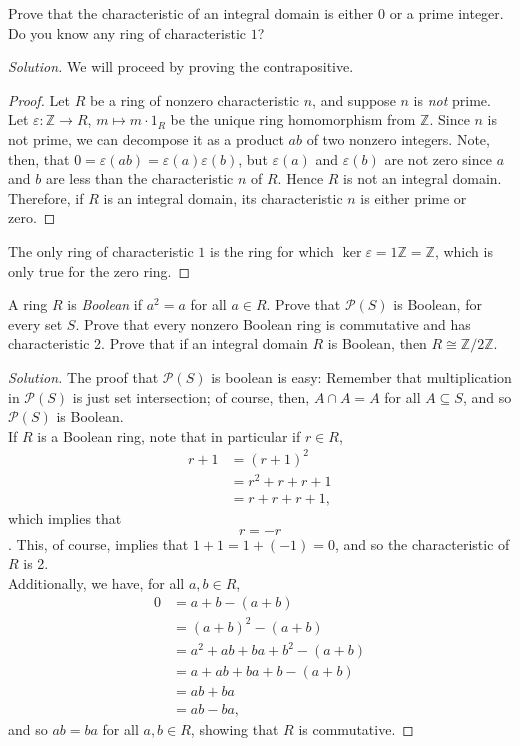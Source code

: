 \documentclass[12pt]{article}
\newenvironment{problem}[2][Problem]{\begin{trivlist}
\item[\hskip \labelsep {\bfseries #1}\hskip \labelsep {\bfseries #2.}]}{\end{trivlist}}
\newenvironment{solution}
  {\renewcommand\qedsymbol{$\blacksquare$}\begin{proof}[Solution]}
{\end{proof}}
\newenvironment{sproof}{
  \renewcommand\qedsymbol{$\square$}
  \begin{proof}
  }{
  \end{proof}
}
\theoremstyle{remark}
\begin{document}
\begin{problem}{3.14}
  Prove that the characteristic of an integral domain is either $0$ or a prime integer.
  Do you know any ring of characteristic $1$?
\end{problem}
\begin{solution}
  We will proceed by proving the contrapositive.
  \begin{sproof}
    Let $R$ be a ring of nonzero characteristic $n$, and suppose $n$ is \textit{not} prime.
    Let $\varepsilon:\mathbb{Z}\to R$, $m\mapsto m\cdot1_R$ be the unique ring homomorphism from $\mathbb{Z}$.
    Since $n$ is not prime, we can decompose it as a product $ab$ of two nonzero integers.
    Note, then, that $0=\varepsilon(ab)=\varepsilon(a)\varepsilon(b)$, but 
    $\varepsilon(a)$ and $\varepsilon(b)$ are not zero since $a$ and $b$ are less than
    the characteristic $n$ of $R$.
    Hence $R$ is not an integral domain.\\
    \indent Therefore, if $R$ is an integral domain, its characteristic $n$ is either prime or zero.
  \end{sproof}
  The only ring of characteristic $1$ is the ring for which $\ker\varepsilon=1\mathbb{Z}=\mathbb{Z}$,
   which is only true for the zero ring.
\end{solution}

\begin{problem}{3.15}
  A ring $R$ is \textit{Boolean} if $a^2=a$ for all $a\in R$.
  Prove that $\mathscr{P}(S)$ is Boolean, for every set $S$.
  Prove that every nonzero Boolean ring is commutative and has characteristic 2.
  Prove that if an integral domain $R$ is Boolean, then $R\cong\mathbb{Z}/2\mathbb{Z}$.
\end{problem}
\begin{solution}
  The proof that $\mathscr{P}(S)$ is boolean is easy: 
  Remember that multiplication in $\mathscr{P}(S)$ is just set intersection;
  of course, then, $A\cap A=A$ for all $A\subseteq S$, and so $\mathscr{P}(S)$ is Boolean.\\
  \indent If $R$ is a Boolean ring, note that in particular if $r\in R$, 
    \begin{align*}
      r+1 &= (r+1)^2 \\
      &= r^2+r+r+1 \\
      &= r+r+r+1,
    \end{align*}
    which implies that $$r=-r$$.
    This, of course, implies that $1+1=1+(-1)=0$, and so the characteristic of $R$ is 2.\\
    \indent Additionally, we have, for all $a,b\in R$,
      \begin{align*}
        0 &= a+b-(a+b)\\
        &= (a+b)^2-(a+b)\\
        &= a^2+ab+ba+b^2-(a+b)\\
        &= a+ab+ba+b-(a+b)\\
        &= ab+ba\\
        &= ab-ba,
      \end{align*}
    and so $ab=ba$ for all $a,b\in R$, showing that $R$ is commutative.
\end{solution}
\end{document}
